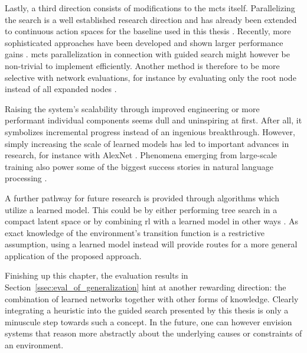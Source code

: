 Lastly, a third direction consists of modifications to the \gls{mcts} itself. Parallelizing the search is a well established research direction \cite{chaslotParallelMonteCarloTree2008} and has already been extended to continuous action spaces for the baseline used in this thesis \cite{kurzerParallelizationMonteCarlo2020}. Recently, more sophisticated approaches have been developed and shown larger performance gains \cite{liuWATCHUNOBSERVEDSIMPLE2020}. \gls{mcts} parallelization in connection with guided search might however be non-trivial to implement efficiently. Another method is therefore to be more selective with network evaluations, for instance by evaluating only the root node instead of all expanded nodes \cite{kurzerAcceleratingCooperativePlanning2020}.

Raising the system's scalability through improved engineering or more performant individual components seems dull and uninspiring at first. After all, it symbolizes incremental progress instead of an ingenious breakthrough. However, simply increasing the scale of learned models has led to important advances in research, for instance with AlexNet \cite{krizhevskyImageNetClassificationDeep2017}. Phenomena emerging from large-scale training also power some of the biggest success stories in natural language processing \cite{brownLanguageModelsAre2020}.

A further pathway for future research is provided through algorithms which utilize a learned model. This could be by either performing tree search in a compact latent space \cite{schrittwieserMasteringAtariGo2020} or by combining \gls{rl} with a learned model in other ways \cite{hongModelbasedLookaheadReinforcement2019}. As exact knowledge of the environment's transition function is a restrictive assumption, using a learned model instead will provide routes for a more general application of the proposed approach.

Finishing up this chapter, the evaluation results in Section~\ref{ssec:eval_of_generalization} hint at another rewarding direction: the combination of learned networks together with other forms of knowledge. Clearly integrating a heuristic into the guided search presented by this thesis is only a minuscule step towards such a concept. In the future, one can however envision systems that reason more abstractly about the underlying causes or constraints of an environment.